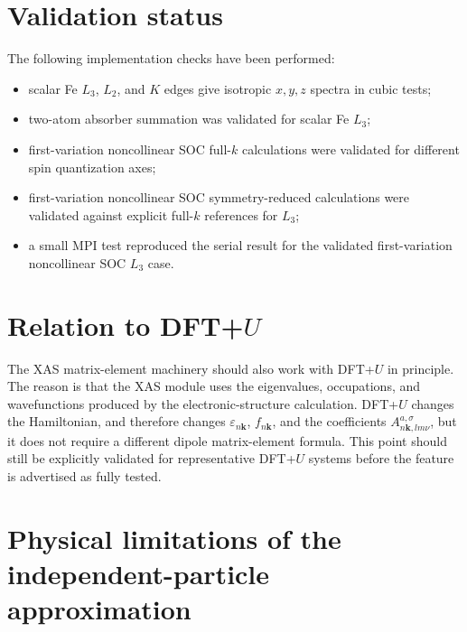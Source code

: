 \documentclass[11pt,a4paper]{article}
\newcommand{\kvec}{\mathbf{k}}
\newcommand{\absr}{a}
\newcommand{\sig}{\sigma}
\begin{document}
\section{Validation status}

The following implementation checks have been performed:
\begin{itemize}
  \item scalar Fe \(L_3\), \(L_2\), and \(K\) edges give isotropic
  \(x,y,z\) spectra in cubic tests;
  \item two-atom absorber summation was validated for scalar Fe \(L_3\);
  \item first-variation noncollinear SOC full-\(k\) calculations were validated
  for different spin quantization axes;
  \item first-variation noncollinear SOC symmetry-reduced calculations were
  validated against explicit full-\(k\) references for \(L_3\);
  \item a small MPI test reproduced the serial result for the validated
  first-variation noncollinear SOC \(L_3\) case.
\end{itemize}

\section{Relation to DFT+\(U\)}

The XAS matrix-element machinery should also work with DFT+\(U\) in principle.
The reason is that the XAS module uses the eigenvalues, occupations, and
wavefunctions produced by the electronic-structure calculation. DFT+\(U\)
changes the Hamiltonian, and therefore changes \(\varepsilon_{n\kvec}\),
\(f_{n\kvec}\), and the coefficients \(A^{\absr,\sig}_{n\kvec,lm\nu}\), but it
does not require a different dipole matrix-element formula. This point should
still be explicitly validated for representative DFT+\(U\) systems before the
feature is advertised as fully tested.

\section{Physical limitations of the independent-particle approximation}
\end{document}
